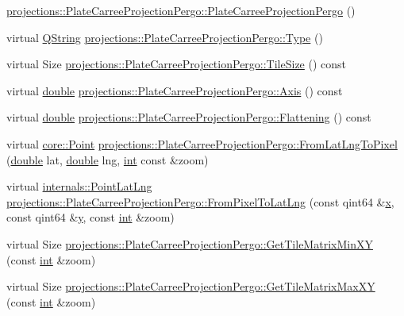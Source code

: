 \begin{DoxyCompactItemize}
\item 
\hyperlink{group___o_p_map_widget_ga9efefe0ffe073b3074b5ada1a6f0f267}{projections\-::\-Plate\-Carree\-Projection\-Pergo\-::\-Plate\-Carree\-Projection\-Pergo} ()
\item 
virtual \hyperlink{group___u_a_v_objects_plugin_gab9d252f49c333c94a72f97ce3105a32d}{Q\-String} \hyperlink{group___o_p_map_widget_ga0c0b83ba2e36423002e0561797a75d6f}{projections\-::\-Plate\-Carree\-Projection\-Pergo\-::\-Type} ()
\item 
virtual Size \hyperlink{group___o_p_map_widget_ga459271797b70ca4aacc1bc616c8588e1}{projections\-::\-Plate\-Carree\-Projection\-Pergo\-::\-Tile\-Size} () const 
\item 
virtual \hyperlink{_super_l_u_support_8h_a8956b2b9f49bf918deed98379d159ca7}{double} \hyperlink{group___o_p_map_widget_ga189bc30528175596e1010dae2d199d1d}{projections\-::\-Plate\-Carree\-Projection\-Pergo\-::\-Axis} () const 
\item 
virtual \hyperlink{_super_l_u_support_8h_a8956b2b9f49bf918deed98379d159ca7}{double} \hyperlink{group___o_p_map_widget_ga03c9086ef72e6a349a5ab125cfd6533e}{projections\-::\-Plate\-Carree\-Projection\-Pergo\-::\-Flattening} () const 
\item 
virtual \hyperlink{structcore_1_1_point}{core\-::\-Point} \hyperlink{group___o_p_map_widget_gaf785f752ac316a8cb94c96dacabdc244}{projections\-::\-Plate\-Carree\-Projection\-Pergo\-::\-From\-Lat\-Lng\-To\-Pixel} (\hyperlink{_super_l_u_support_8h_a8956b2b9f49bf918deed98379d159ca7}{double} lat, \hyperlink{_super_l_u_support_8h_a8956b2b9f49bf918deed98379d159ca7}{double} lng, \hyperlink{ioapi_8h_a787fa3cf048117ba7123753c1e74fcd6}{int} const \&zoom)
\item 
virtual \hyperlink{structinternals_1_1_point_lat_lng}{internals\-::\-Point\-Lat\-Lng} \hyperlink{group___o_p_map_widget_ga3bd1d9693dd54a69baa88bed4785311d}{projections\-::\-Plate\-Carree\-Projection\-Pergo\-::\-From\-Pixel\-To\-Lat\-Lng} (const qint64 \&\hyperlink{glext_8h_a1db9d104e3c2128177f26aff7b46982f}{x}, const qint64 \&\hyperlink{glext_8h_a42315f3ed8fff752bb47fd782309fcfc}{y}, const \hyperlink{ioapi_8h_a787fa3cf048117ba7123753c1e74fcd6}{int} \&zoom)
\item 
virtual Size \hyperlink{group___o_p_map_widget_ga95a4e9e98cce1bb7cc3d4afb9e30f1b7}{projections\-::\-Plate\-Carree\-Projection\-Pergo\-::\-Get\-Tile\-Matrix\-Min\-X\-Y} (const \hyperlink{ioapi_8h_a787fa3cf048117ba7123753c1e74fcd6}{int} \&zoom)
\item 
virtual Size \hyperlink{group___o_p_map_widget_gabf54183dc66f5385ffa794ce7120629c}{projections\-::\-Plate\-Carree\-Projection\-Pergo\-::\-Get\-Tile\-Matrix\-Max\-X\-Y} (const \hyperlink{ioapi_8h_a787fa3cf048117ba7123753c1e74fcd6}{int} \&zoom)

\end{DoxyCompactItemize}
